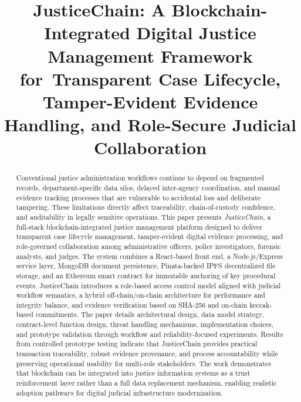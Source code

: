 \documentclass[conference]{IEEEtran}
\begin{document}
\title{JusticeChain: A Blockchain-Integrated Digital Justice Management Framework for\
Transparent Case Lifecycle, Tamper-Evident Evidence Handling, and Role-Secure Judicial Collaboration}

\author{
\and
{}
}

\maketitle

\begin{abstract}
Conventional justice administration workflows continue to depend on fragmented records, department-specific data silos, delayed inter-agency coordination, and manual evidence tracking processes that are vulnerable to accidental loss and deliberate tampering. These limitations directly affect traceability, chain-of-custody confidence, and auditability in legally sensitive operations. This paper presents \textit{JusticeChain}, a full-stack blockchain-integrated justice management platform designed to deliver transparent case lifecycle management, tamper-evident digital evidence processing, and role-governed collaboration among administrative officers, police investigators, forensic analysts, and judges. The system combines a React-based front end, a Node.js/Express service layer, MongoDB document persistence, Pinata-backed IPFS decentralized file storage, and an Ethereum smart contract for immutable anchoring of key procedural events. JusticeChain introduces a role-based access control model aligned with judicial workflow semantics, a hybrid off-chain/on-chain architecture for performance and integrity balance, and evidence verification based on SHA-256 and on-chain keccak-based commitments. The paper details architectural design, data model strategy, contract-level function design, threat handling mechanisms, implementation choices, and prototype validation through workflow and reliability-focused experiments. Results from controlled prototype testing indicate that JusticeChain provides practical transaction traceability, robust evidence provenance, and process accountability while preserving operational usability for multi-role stakeholders. The work demonstrates that blockchain can be integrated into justice information systems as a trust reinforcement layer rather than a full data replacement mechanism, enabling realistic adoption pathways for digital judicial infrastructure modernization.
\end{abstract}
\end{document}
